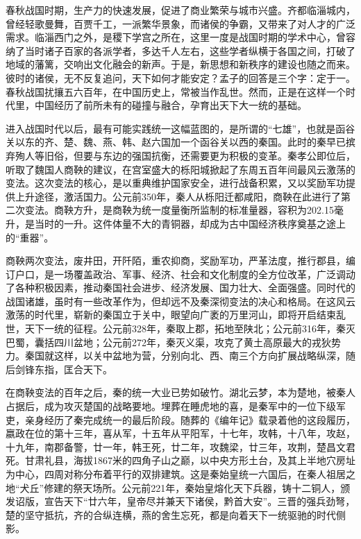 春秋战国时期，生产力的快速发展，促进了商业繁荣与城市兴盛。齐都临淄城内，曾经轻歌曼舞，百贾千工，一派繁华景象，而诸侯的争霸，又带来了对人才的广泛需求。临淄西门之外，是稷下学宫之所在，这里一度是战国时期的学术中心，曾容纳了当时诸子百家的各派学者，多达千人左右，这些学者纵横于各国之间，打破了地域的藩篱，交响出文化融会的新声。于是，新思想和新秩序的建设也随之而来。彼时的诸侯，无不反复追问，天下如何才能安定？孟子的回答是三个字：定于一。春秋战国扰攘五六百年，在中国历史上，常被当作乱世。然而，正是在这样一个时代里，中国经历了前所未有的碰撞与融合，孕育出天下大一统的基础。

进入战国时代以后，最有可能实践统一这幅蓝图的，是所谓的“七雄”，也就是函谷关以东的齐、楚、魏、燕、韩、赵六国加一个函谷关以西的秦国。此时的秦早已摈弃殉人等旧俗，但要与东边的强国抗衡，还需要更为积极的变革。秦孝公即位后，听取了魏国人商鞅的建议，在宫室盛大的栎阳城掀起了东周五百年间最风云激荡的变法。这次变法的核心，是以重典维护国家安全，进行战备积累，又以奖励军功提供上升途径，激活国力。公元前350年，秦人从栎阳迁都咸阳，商鞅在此进行了第二次变法。商鞅方升，是商鞅为统一度量衡所监制的标准量器，容积为202.15毫升，是当时的一升。这件体量不大的青铜器，却成为古中国经济秩序奠基之途上的“重器”。

商鞅两次变法，废井田，开阡陌，重农抑商，奖励军功，严革法度，推行郡县，编订户口，是一场覆盖政治、军事、经济、社会和文化制度的全方位改革，广泛调动了各种积极因素，推动秦国社会进步、经济发展、国力壮大、全面强盛。同时代的战国诸雄，虽时有一些改革作为，但却远不及秦深彻变法的决心和格局。在这风云激荡的时代里，崭新的秦国立于关中，眼望向广袤的万里河山，即将开启结束乱世，天下一统的征程。公元前328年，秦取上郡，拓地至陕北；公元前316年，秦灭巴蜀，囊括四川盆地；公元前272年，秦灭义渠，攻克了黄土高原最大的戎狄势力。秦国就这样，以关中盆地为营，分别向北、西、南三个方向扩展战略纵深，随后剑锋东指，匡合天下。

在商鞅变法的百年之后，秦的统一大业已势如破竹。湖北云梦，本为楚地，被秦人占据后，成为攻灭楚国的战略要地。埋葬在睡虎地的喜，是秦军中的一位下级军吏，亲身经历了秦完成统一的最后阶段。随葬的《编年记》载录着他的这段履历，嬴政在位的第十三年，喜从军，十五年从平阳军，十七年，攻韩，十八年，攻赵，十九年，南郡备警，廿一年，韩王死，廿二年，攻魏梁，廿三年，攻荆，楚昌文君死。甘肃礼县，海拔1867米的四角子山之巅，以中央方形土台，及其上半地穴房址为中心，四周对称分布着平行的双排建筑。这是秦始皇统一六国后，在秦人祖居之地“犬丘”修建的祭天场所。公元前221年，秦始皇熔化天下兵器，铸十二铜人，颁发诏版，宣告天下“廿六年，皇帝尽并兼天下诸侯，黔首大安”。三晋的强兵劲弩，楚的坚守抵抗，齐的合纵连横，燕的舍生忘死，都是向着天下一统驱驰的时代侧影。

